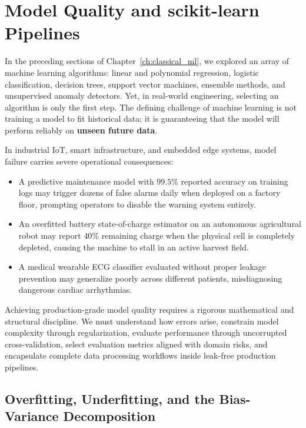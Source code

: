 \section{Model Quality and scikit-learn Pipelines}\label{sec:model_quality_pipelines}

In the preceding sections of Chapter~\ref{ch:classical_ml}, we explored an array of machine learning algorithms: linear and polynomial regression, logistic classification, decision trees, support vector machines, ensemble methods, and unsupervised anomaly detectors. Yet, in real-world engineering, selecting an algorithm is only the first step. The defining challenge of machine learning is not training a model to fit historical data; it is guaranteeing that the model will perform reliably on \textbf{unseen future data}.

In industrial IoT, smart infrastructure, and embedded edge systems, model failure carries severe operational consequences:
\begin{itemize}
    \item A predictive maintenance model with $99.5\%$ reported accuracy on training logs may trigger dozens of false alarms daily when deployed on a factory floor, prompting operators to disable the warning system entirely.
    \item An overfitted battery state-of-charge estimator on an autonomous agricultural robot may report $40\%$ remaining charge when the physical cell is completely depleted, causing the machine to stall in an active harvest field.
    \item A medical wearable ECG classifier evaluated without proper leakage prevention may generalize poorly across different patients, misdiagnosing dangerous cardiac arrhythmias.
\end{itemize}

Achieving production-grade model quality requires a rigorous mathematical and structural discipline. We must understand how errors arise, constrain model complexity through regularization, evaluate performance through uncorrupted cross-validation, select evaluation metrics aligned with domain risks, and encapsulate complete data processing workflows inside leak-free production pipelines.

\subsection{Overfitting, Underfitting, and the Bias-Variance Decomposition}\label{subsec:bias_variance}

